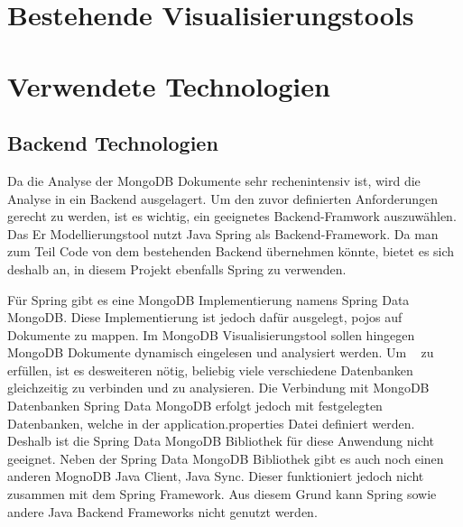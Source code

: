 \iffalse
Auf der Basis der im vorangegangenen Kapitel erstellten Problemanalyse 
und der im Grundlagenkapitel aufgearbeiteten theoretischen Kenntnisse 
wird ein Lösungskonzept erarbeitet.

Bei Software-Projekten entspricht dieses Kapitel typischerweise der 
Analyse \& Design-Phase des \ac{rup}. Typische Ergebnisse dieser Phase sind 
Klassendiagramme etc.
\fi

\section{Bestehende Visualisierungstools}
\label{sec:bestehende_visualisierungstools}


\section{Verwendete Technologien}
\label{sec:verwendete_technologien}

\subsection{Backend Technologien}
\label{sec:verwendete_technologien_backend}

Da die Analyse der MongoDB Dokumente sehr rechenintensiv ist, wird die Analyse in ein Backend ausgelagert.
Um den zuvor definierten Anforderungen gerecht zu werden, ist es wichtig, ein geeignetes Backend-Framwork auszuwählen.
Das Er Modellierungstool nutzt Java Spring als Backend-Framework.
Da man zum Teil Code von dem bestehenden Backend übernehmen könnte, bietet es sich deshalb an, in diesem Projekt ebenfalls Spring zu verwenden.

Für Spring gibt es eine MongoDB Implementierung namens Spring Data MongoDB.
Diese Implementierung ist jedoch dafür ausgelegt, \ac{pojo}s auf Dokumente zu mappen.
Im MongoDB Visualisierungstool sollen hingegen MongoDB Dokumente dynamisch eingelesen und analysiert werden.
Um ~ zu erfüllen, ist es desweiteren nötig, beliebig viele verschiedene Datenbanken gleichzeitig zu verbinden und zu analysieren.
Die Verbindung mit MongoDB Datenbanken Spring Data MongoDB erfolgt jedoch mit festgelegten Datenbanken, welche in der application.properties Datei definiert werden.
~\autocite{spring:spring-data-mongodb}
Deshalb ist die Spring Data MongoDB Bibliothek für diese Anwendung nicht geeignet.
Neben der Spring Data MongoDB Bibliothek gibt es auch noch einen anderen MognoDB Java Client, Java Sync.
Dieser funktioniert jedoch nicht zusammen mit dem Spring Framework.
Aus diesem Grund kann Spring sowie andere Java Backend Frameworks nicht genutzt werden.

